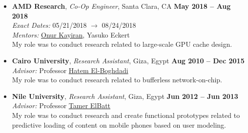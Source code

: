 \documentclass[10pt,a4]{article}
\begin{document}
\begin{itemize}
\item{\bf AMD Research}, {\it Co-Op Engineer}, Santa Clara, CA \hfill {\bf May 2018 -- Aug 2018}\\
{\it Exact Dates:} 05/21/2018 $\rightarrow$ 08/24/2018\\
{\it Mentors:} \href{https://okayiran.github.io/}{Onur Kayiran}, Yasuko Eckert \\
My role was to conduct research related to large-scale GPU cache design. 

\item{\bf Cairo University}, {\it Research Assistant}, Giza, Egypt \hfill {\bf Aug 2010 -- Dec 2015}\\
{\it Advisor:} Professor \href{http://scholar.cu.edu.eg/?q=helboghdadi}{Hatem El-Boghdadi}\\
My role was to conduct research related to bufferless network-on-chip.

\item{\bf Nile University}, {\it Research Assistant}, Giza, Egypt \hfill {\bf Jun 2012 -- Jun 2013}\\
{\it Advisor:} Professor \href{https://sites.google.com/site/telbatt/}{Tamer ElBatt}\\
My role was to conduct research and create functional prototypes related to predictive loading of content on mobile phones based on user modeling. 


\end{itemize}
\end{document}
